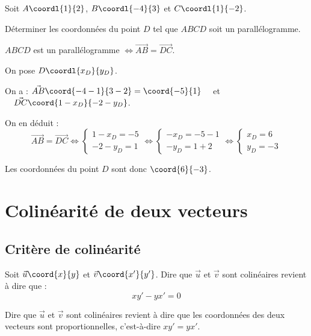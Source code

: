 \documentclass{poly}
\begin{document}
\begin{methode}
	Soit $A\coordl{1}{2}$, $B\coordl{-4}{3}$ et $C\coordl{1}{-2}$.

	Déterminer les coordonnées du point $D$ tel que $ABCD$ soit un parallélogramme.

	\begin{correction}
		$ABCD$ est un parallélogramme $\iff \vec{AB} = \vec{DC}$.

		On pose $D\coordl{x_D}{y_D}$.

		On a : $\vec{AB}\coord{-4-1}{3-2} = \coord{-5}{1}\quad$ et $\quad\vec{DC}\coord{1-x_D}{-2-y_D}$.

		On en déduit :
		$$\vec{AB} = \vec{DC} \iff \begin{cases} 1 - x_D = -5 \\ -2 - y_D = 1 \end{cases} \iff \begin{cases} -x_D = -5 - 1 \\ -y_D = 1 + 2 \end{cases} \iff \begin{cases} x_D = 6 \\ y_D = -3 \end{cases}$$

		Les coordonnées du point $D$ sont donc $\coord{6}{-3}$.
	\end{correction}
\end{methode}

\section{Colinéarité de deux vecteurs}

\subsection{Critère de colinéarité}

\begin{prop}
	Soit $\vec{u}\coord{x}{y}$ et $\vec{v}\coord{x'}{y'}$. Dire que $\vec{u}$ et $\vec{v}$ sont colinéaires revient à dire que :
	\[
		xy' - yx' = 0
	\]
\end{prop}

\begin{remarque}
	Dire que $\vec{u}$ et $\vec{v}$ sont colinéaires revient à dire que les coordonnées des deux vecteurs sont proportionnelles, c'est-à-dire $xy' = yx'$.
\end{remarque}
\end{document}
